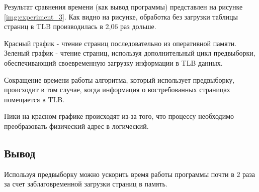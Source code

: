 \begin{figure}[H]
\end{figure}

Результат сравнения времени (как вывод программы) представлен на рисунке \ref{img:experiment_3}. Как видно на рисунке, обработка без загрузки таблицы страниц в TLB производилась в 2,06 раз дольше.

Красный график - чтение страниц последовательно из оперативной памяти. Зеленый график - чтение страниц, используя дополнительный цикл предвыборки, обеспечивающий своевременную загрузку информации в TLB данных.

Сокращение времени работы алгоритма, который использует предвыборку, происходит в том случае, когда информация о востребованных страницах помещается в TLB. 

Пики на красном графике происходят из-за того, что процессу необходимо преобразовать физический адрес в логический.

\subsection*{Вывод}
Используя предвыборку можно ускорить время работы программы почти в 2 раза за счет заблаговременной загрузки страниц в память.